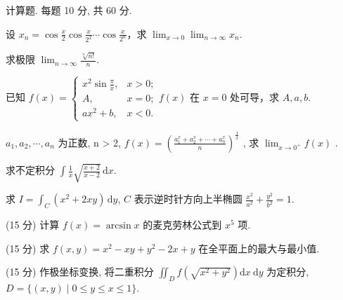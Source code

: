 \par{}
计算题. 每题 10 分, 共 60 分.\par
设 $x_{n} = \cos \frac{x}{2} \cos \frac{x}{2^{2}} \cdots \cos \frac{x}{2^{n}}$，求 $\lim_{x \to 0} \lim_{n \to \infty} x_{n}$.\par
求极限 $\lim_{n\to \infty}\frac{\sqrt[n]{n!}}{n}$.\par
已知 $f(x) = \begin{cases} x^2 \sin \frac{\pi}{x}, & x > 0; \\ A, & x = 0; \\ ax^2 + b, & x < 0. \end{cases}$$f(x)$ 在 $x = 0$ 处可导，求 $A, a, b$.\par
$a_{1}, a_{2}, \cdots, a_{n}$  为正数, n > 2,  $f(x) = \left(\frac{a_{1}^{x} + a_{2}^{x} + \cdots + a_{n}^{x}}{n}\right)^{\frac{1}{x}}$ , 求  $\lim_{x \to 0^{+}} f(x)$ .\par
求不定积分 $\int \frac{1}{x} \sqrt{\frac{x + 2}{x - 2}} \, \mathrm{d}x$.\par
求 $I = \int_{C} (x^{2} + 2xy) \, \mathrm{d}y$, $C$ 表示逆时针方向上半椭圆 $\frac{x^{2}}{a^{2}} + \frac{y^{2}}{b^{2}} = 1$.\par
\par{}
(15 分) 计算 $f(x) = \arcsin x$ 的麦克劳林公式到 $x^5$ 项.\par
\par{}
(15 分) 求 $f(x, y) = x^2 - xy + y^2 - 2x + y$ 在全平面上的最大与最小值.\par
\par{}
(15 分) 作极坐标变换, 将二重积分 $\iint_{D} f\left(\sqrt{x^2 + y^2}\right) \mathrm{d}x \mathrm{~d}y$ 为定积分, $D = \{(x, y) \mid 0 \leq y \leq x \leq 1\}$.\par
$$
